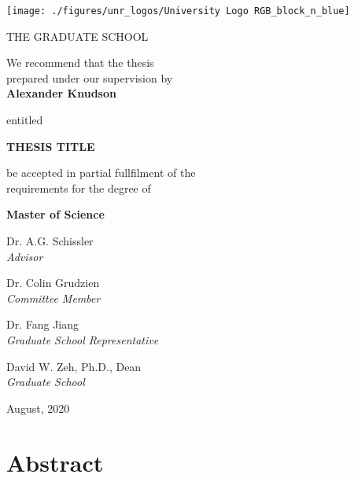 \documentclass[11pt, oneside, openany]{scrbook}
\begin{document}
\begin{center}

\texttt{[image: ./figures/unr\_logos/University Logo RGB\_block\_n\_blue]}

THE GRADUATE SCHOOL

\vspace{1em}
We recommend that the thesis \\
prepared under our supervision by\\

\vspace{1em}
\textbf{Alexander Knudson}

\vspace{1em}
entitled

\textbf{THESIS TITLE}

\vspace{2em}
be accepted in partial fullfilment of the \\
requirements for the degree of

\vspace{1em}
\textbf{Master of Science}

\vspace{1em}
Dr. A.G. Schissler \\
\textit{Advisor}

\vspace{1em}
Dr. Colin Grudzien\\
\textit{Committee Member}

\vspace{1em}
Dr. Fang Jiang \\
\textit{Graduate School Representative}

\vspace{1em}
David W. Zeh, Ph.D., Dean \\
\textit{Graduate School}

\vspace{1em}
August, 2020
\end{center}


\newpage
\setcounter{page}{1} %
\section*{Abstract}
\end{document}
